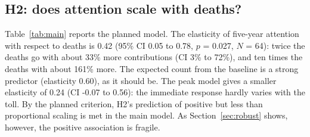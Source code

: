 \documentclass[11pt,a4paper]{article}
\begin{document}
\subsection{H2: does attention scale with deaths?}
Table~\ref{tab:main} reports the planned model. The elasticity of five-year attention with respect to deaths is 0.42 (95\% CI 0.05 to 0.78, $p$ = 0.027, $N$ = 64): twice the deaths go with about 33\% more contributions (CI 3\% to 72\%), and ten times the deaths with about 161\% more. The expected count from the baseline is a strong predictor (elasticity 0.60), as it should be. The peak model gives a smaller elasticity of 0.24 (CI -0.07 to 0.56): the immediate response hardly varies with the toll. By the planned criterion, H2's prediction of positive but less than proportional scaling is met in the main model. As Section~\ref{sec:robust} shows, however, the positive association is fragile.
\end{document}
